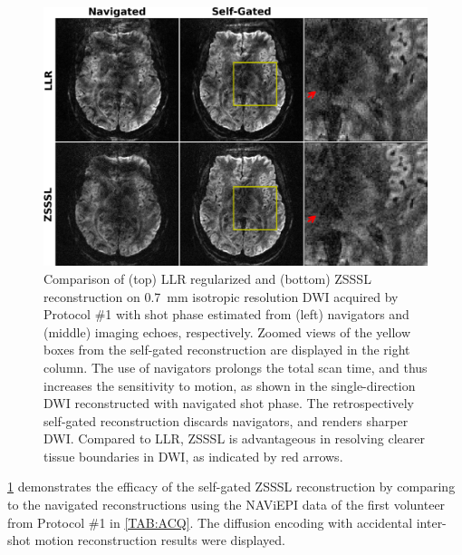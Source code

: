 \documentclass[journal,twoside,web]{ieeecolor}
\begin{document}
	\begin{figure}
		\begin{minipage}[c]{0.75\textwidth}
			\includegraphics[width=\textwidth]{../figures/fig2.png}
		\end{minipage}\hfill
		\begin{minipage}[c]{0.23\textwidth}
			\caption{Comparison of (top) LLR regularized and (bottom) ZSSSL 
				reconstruction on 0.7~mm isotropic resolution DWI 
				acquired by Protocol \#1
				with shot phase estimated from 
				(left) navigators and (middle) imaging echoes, respectively.
				Zoomed views of the yellow boxes from the self-gated reconstruction 
				are displayed in the right column.
				The use of navigators prolongs the total scan time, 
				and thus increases the sensitivity to motion, 
				as shown in the single-direction DWI reconstructed 
				with navigated shot phase.
				The retrospectively self-gated reconstruction discards navigators, 
				and renders sharper DWI. Compared to LLR, ZSSSL is advantageous 
				in resolving clearer tissue boundaries in DWI, 
				as indicated by red arrows.}
				\label{FIG:MOTION_RETRO_TRA}
		\end{minipage}
	\end{figure}
	
	\cref{FIG:MOTION_RETRO_TRA} demonstrates
	the efficacy of the self-gated ZSSSL reconstruction
	by comparing to the navigated reconstructions
	using the NAViEPI data of the first volunteer 
	from Protocol \#1 in \cref{TAB:ACQ}.
	The diffusion encoding with accidental inter-shot motion
	reconstruction results were displayed.
	
\end{document}
